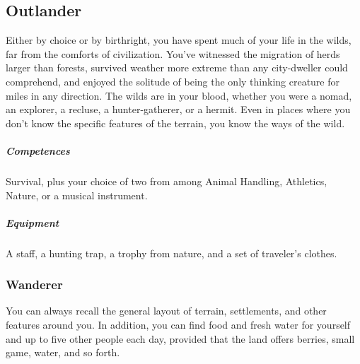 \subsection*{Outlander} \label{ssec::outlander}
    Either by choice or by birthright, you have spent much of your life in the wilds, far from the comforts of civilization.
    You've witnessed the migration of herds larger than forests, survived weather more extreme than any city-dweller could comprehend, and enjoyed the solitude of being the only thinking creature for miles in any direction.
    The wilds are in your blood, whether you were a nomad, an explorer, a recluse, a hunter-gatherer, or a hermit.
    Even in places where you don't know the specific features of the terrain, you know the ways of the wild.

    \subparagraph{Competences} Survival, plus your choice of two from among Animal Handling, Athletics, Nature, or a musical instrument.

    \subparagraph{Equipment} A staff, a hunting trap, a trophy from nature, and a set of traveler's clothes.

    \subsubsection{Wanderer}
        You can always recall the general layout of terrain, settlements, and other features around you.
        In addition, you can find food and fresh water for yourself and up to five other people each day, provided that the land offers berries, small game, water, and so forth.

\newpage

